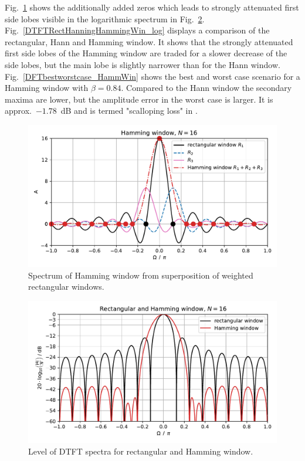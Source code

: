 \documentclass[11pt,a4paper,DIV=12]{scrartcl}
\begin{document}
Fig.~\ref{HammingausRectWindow} shows the additionally added zeros which leads
to strongly attenuated first side lobes visible in the logarithmic spectrum in
Fig.~\ref{DTFTHammingWin_log}.
%
Fig.~\ref{DTFTRectHanningHammingWin_log} displays a comparison of the
rectangular, Hann and Hamming window.
%
It shows that the strongly attenuated first side lobes of the Hamming window
are traded for a slower decrease of the side lobes, but the main lobe is
slightly narrower than for the Hann window.
%
Fig.~\ref{DFTbestworstcase_HammWin} shows the best and worst case scenario for
a Hamming window with $\beta=0.84$.
%
Compared to the Hann window the secondary maxima are lower, but the
amplitude error in the worst case is larger.
%
It is approx.~$-1.78$~dB and is termed "scalloping loss" in \cite{Harris1978}.
\begin{figure}
		\centering
		\includegraphics[]{graphics/Hamming_from_RectWindow.pdf}
		\caption{Spectrum of Hamming window from superposition of weighted
		rectangular windows.}
		\label{HammingausRectWindow}
\end{figure}
\begin{figure}
		\centering
		\includegraphics[]{graphics/DTFTHammingWin_log.pdf}
		\caption{Level of DTFT spectra for rectangular and Hamming window.}
		\label{DTFTHammingWin_log}
\end{figure}
\end{document}

